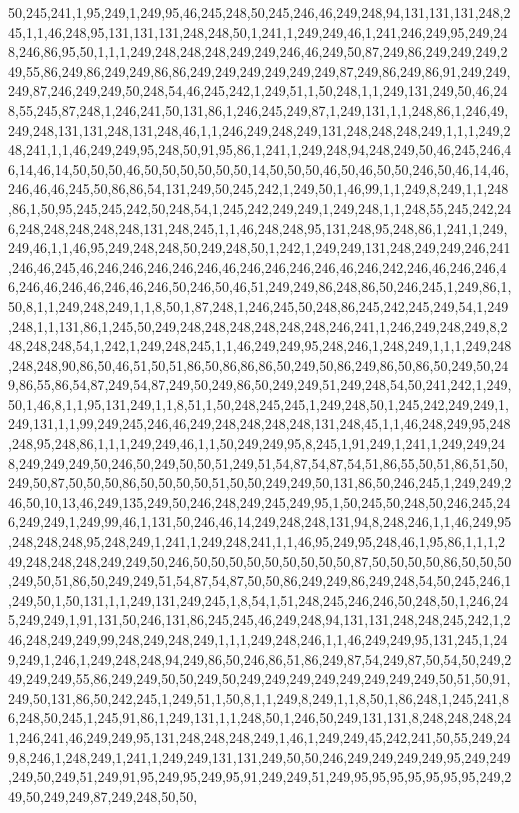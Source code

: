 50,245,241,1,95,249,1,249,95,46,245,248,50,245,246,46,249,248,94,131,131,131,248,245,1,1,46,248,95,131,131,131,248,248,50,1,241,1,249,249,46,1,241,246,249,95,249,248,246,86,95,50,1,1,1,249,248,248,248,249,249,246,46,249,50,87,249,86,249,249,249,249,55,86,249,86,249,249,86,86,249,249,249,249,249,249,87,249,86,249,86,91,249,249,249,87,246,249,249,50,248,54,46,245,242,1,249,51,1,50,248,1,1,249,131,249,50,46,248,55,245,87,248,1,246,241,50,131,86,1,246,245,249,87,1,249,131,1,1,248,86,1,246,49,249,248,131,131,248,131,248,46,1,1,246,249,248,249,131,248,248,248,249,1,1,1,249,248,241,1,1,46,249,249,95,248,50,91,95,86,1,241,1,249,248,94,248,249,50,46,245,246,46,14,46,14,50,50,50,46,50,50,50,50,50,50,14,50,50,50,46,50,46,50,50,246,50,46,14,46,246,46,46,245,50,86,86,54,131,249,50,245,242,1,249,50,1,46,99,1,1,249,8,249,1,1,248,86,1,50,95,245,245,242,50,248,54,1,245,242,249,249,1,249,248,1,1,248,55,245,242,246,248,248,248,248,248,131,248,245,1,1,46,248,248,95,131,248,95,248,86,1,241,1,249,249,46,1,1,46,95,249,248,248,50,249,248,50,1,242,1,249,249,131,248,249,249,246,241,246,46,245,46,246,246,246,246,246,46,246,246,246,246,46,246,242,246,46,246,246,46,246,46,246,46,246,46,246,50,246,50,46,51,249,249,86,248,86,50,246,245,1,249,86,1,50,8,1,1,249,248,249,1,1,8,50,1,87,248,1,246,245,50,248,86,245,242,245,249,54,1,249,248,1,1,131,86,1,245,50,249,248,248,248,248,248,248,246,241,1,246,249,248,249,8,248,248,248,54,1,242,1,249,248,245,1,1,46,249,249,95,248,246,1,248,249,1,1,1,249,248,248,248,90,86,50,46,51,50,51,86,50,86,86,86,50,249,50,86,249,86,50,86,50,249,50,249,86,55,86,54,87,249,54,87,249,50,249,86,50,249,249,51,249,248,54,50,241,242,1,249,50,1,46,8,1,1,95,131,249,1,1,8,51,1,50,248,245,245,1,249,248,50,1,245,242,249,249,1,249,131,1,1,99,249,245,246,46,249,248,248,248,248,131,248,45,1,1,46,248,249,95,248,248,95,248,86,1,1,1,249,249,46,1,1,50,249,249,95,8,245,1,91,249,1,241,1,249,249,248,249,249,249,50,246,50,249,50,50,51,249,51,54,87,54,87,54,51,86,55,50,51,86,51,50,249,50,87,50,50,50,86,50,50,50,50,51,50,50,249,249,50,131,86,50,246,245,1,249,249,246,50,10,13,46,249,135,249,50,246,248,249,245,249,95,1,50,245,50,248,50,246,245,246,249,249,1,249,99,46,1,131,50,246,46,14,249,248,248,131,94,8,248,246,1,1,46,249,95,248,248,248,95,248,249,1,241,1,249,248,241,1,1,46,95,249,95,248,46,1,95,86,1,1,1,249,248,248,248,249,249,50,246,50,50,50,50,50,50,50,50,50,87,50,50,50,50,86,50,50,50,249,50,51,86,50,249,249,51,54,87,54,87,50,50,86,249,249,86,249,248,54,50,245,246,1,249,50,1,50,131,1,1,249,131,249,245,1,8,54,1,51,248,245,246,246,50,248,50,1,246,245,249,249,1,91,131,50,246,131,86,245,245,46,249,248,94,131,131,248,248,245,242,1,246,248,249,249,99,248,249,248,249,1,1,1,249,248,246,1,1,46,249,249,95,131,245,1,249,249,1,246,1,249,248,248,94,249,86,50,246,86,51,86,249,87,54,249,87,50,54,50,249,249,249,249,55,86,249,249,50,50,249,50,249,249,249,249,249,249,249,249,50,51,50,91,249,50,131,86,50,242,245,1,249,51,1,50,8,1,1,249,8,249,1,1,8,50,1,86,248,1,245,241,86,248,50,245,1,245,91,86,1,249,131,1,1,248,50,1,246,50,249,131,131,8,248,248,248,241,246,241,46,249,249,95,131,248,248,248,249,1,46,1,249,249,45,242,241,50,55,249,249,8,246,1,248,249,1,241,1,249,249,131,131,249,50,50,246,249,249,249,249,95,249,249,249,50,249,51,249,91,95,249,95,249,95,91,249,249,51,249,95,95,95,95,95,95,95,249,249,50,249,249,87,249,248,50,50,